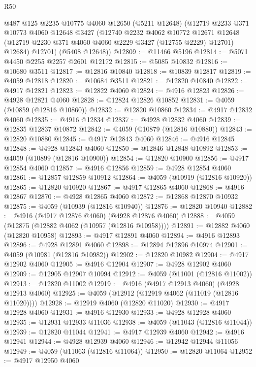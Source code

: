\begin{lexlean}{R50}
\begin{coremodule}
      @487
      @125
      @2235
      @10775
      @4060
      @12650
      (@5211 @12648)
      (@12719
        @2233
        @371
        @10773
        @4060
        @12648
        @3427
        (@12740
          @2232
          @4062
          @10772
          @12671
          @12648
          (@12719 @2230 @371 @4060 @4060 @2229 @3427 (@12755 @2229) @12701)
          @12684)
        @12701)
      (@5408 @12648))
@12809 := @11466 @5196
@12814 := @5071 @4450 @2255 @2257 @2601 @12172
@12815 := @5085 @10832
@12816 := @10680 @3511
@12817 := @12816 @10840
@12818 := @10839 @12817
@12819 := @4059 @12818
@12820 := @10684 @3511
@12821 := @12820 @10840
@12822 := @4917 @12821
@12823 := @12822 @4060
@12824 := @4916 @12823
@12826 := @4928 @12821 @4060
@12828 := @12824 @12826 @10852
@12831 := @4059 (@10859 (@12816 @10860))
@12832 := @12820 @10860
@12834 := @4917 @12832 @4060
@12835 := @4916 @12834
@12837 := @4928 @12832 @4060
@12839 := @12835 @12837 @10872
@12842 := @4059 (@10879 (@12816 @10880))
@12843 := @12820 @10880
@12845 := @4917 @12843 @4060
@12846 := @4916 @12845
@12848 := @4928 @12843 @4060
@12850 := @12846 @12848 @10892
@12853 := @4059 (@10899 (@12816 @10900))
@12854 := @12820 @10900
@12856 := @4917 @12854 @4060
@12857 := @4916 @12856
@12859 := @4928 @12854 @4060
@12861 := @12857 @12859 @10912
@12864 := @4059 (@10919 (@12816 @10920))
@12865 := @12820 @10920
@12867 := @4917 @12865 @4060
@12868 := @4916 @12867
@12870 := @4928 @12865 @4060
@12872 := @12868 @12870 @10932
@12875 := @4059 (@10939 (@12816 @10940))
@12876 := @12820 @10940
@12882 := @4916 (@4917 @12876 @4060) (@4928 @12876 @4060)
@12888 := @4059 (@12875 (@12882 @4062 (@10957 (@12816 @10958))))
@12891 := @12882 @4060 (@12820 @10958)
@12893 := @4917 @12891 @4060
@12894 := @4916 @12893
@12896 := @4928 @12891 @4060
@12898 := @12894 @12896 @10974
@12901 := @4059 (@10981 (@12816 @10982))
@12902 := @12820 @10982
@12904 := @4917 @12902 @4060
@12905 := @4916 @12904
@12907 := @4928 @12902 @4060
@12909 := @12905 @12907 @10994
@12912 := @4059 (@11001 (@12816 @11002))
@12913 := @12820 @11002
@12919 := @4916 (@4917 @12913 @4060) (@4928 @12913 @4060)
@12925 := @4059 (@12912 (@12919 @4062 (@11019 (@12816 @11020))))
@12928 := @12919 @4060 (@12820 @11020)
@12930 := @4917 @12928 @4060
@12931 := @4916 @12930
@12933 := @4928 @12928 @4060
@12935 := @12931 @12933 @11036
@12938 := @4059 (@11043 (@12816 @11044))
@12939 := @12820 @11044
@12941 := @4917 @12939 @4060
@12942 := @4916 @12941
@12944 := @4928 @12939 @4060
@12946 := @12942 @12944 @11056
@12949 := @4059 (@11063 (@12816 @11064))
@12950 := @12820 @11064
@12952 := @4917 @12950 @4060

\end{coremodule}
\end{lexlean}
